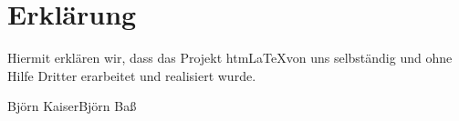 \documentclass[	a4paper,		%
		titlepage, 		%
		fontsize=12pt		%
		]{scrartcl} 		%
\begin{document}
\newpage
\nocite{Algorithmen_in_C++}
\nocite{Algorithmen_in_Java}


\newpage
\section{Erklärung}
Hiermit erklären wir, dass das Projekt htm\LaTeX von uns selbständig und ohne Hilfe Dritter erarbeitet und realisiert wurde.

\vspace{3cm}
\noindent
\hrulefill \hfill \hrulefill \newline
Björn Kaiser\hfill Björn Baß
\newpage
\newpage	%
\end{document}
